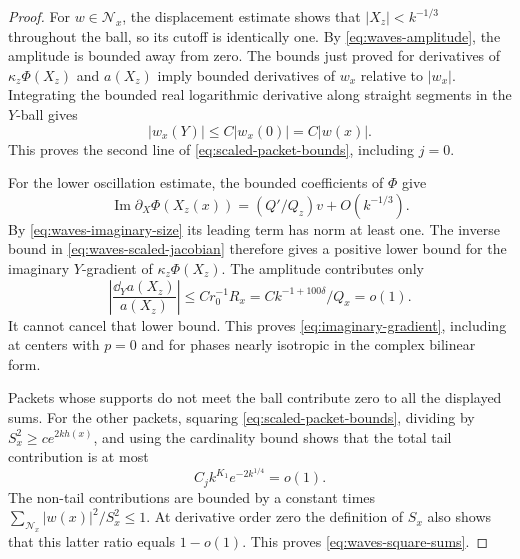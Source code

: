 \begin{proof}
For \(w\in\mathcal N_x\), the displacement estimate shows that
\(|X_z|<k^{-1/3}\) throughout the ball, so its cutoff is identically
one. By \eqref{eq:waves-amplitude}, the amplitude is bounded away
from zero. The bounds just proved for derivatives of
\(\kappa_z\Phi(X_z)\) and \(a(X_z)\) imply bounded derivatives of
\(w_x\) relative to \(|w_x|\).
Integrating the bounded real logarithmic derivative along straight
segments in the \(Y\)-ball gives
\[
 |w_x(Y)|\le C|w_x(0)|=C|w(x)|.
\]
This proves the second line of \eqref{eq:scaled-packet-bounds},
including \(j=0\).

For the lower oscillation estimate, the bounded coefficients of
\(\Phi\) give
\[
 \operatorname{Im}\partial_X\Phi(X_z(x))
   =(Q'/Q_z)v+O(k^{-1/3}).
\]
By \eqref{eq:waves-imaginary-size} its leading term has norm at
least one. The inverse bound in \eqref{eq:waves-scaled-jacobian}
therefore gives a positive lower bound for the imaginary
\(Y\)-gradient of \(\kappa_z\Phi(X_z)\).
The amplitude contributes only
\[
 \left|\frac{\dd_Ya(X_z)}{a(X_z)}\right|
 \le C r_0^{-1}R_x=Ck^{-1+100\delta}/Q_x=o(1).
\]
It cannot cancel that lower bound.
This proves \eqref{eq:imaginary-gradient}, including at centers
with \(p=0\) and for phases nearly isotropic in the complex
bilinear form.

Packets whose supports do not meet the ball contribute zero to
all the displayed sums. For the other packets, squaring
\eqref{eq:scaled-packet-bounds}, dividing by
\(S_x^2\ge c e^{2kh(x)}\), and using the cardinality bound shows
that the total tail contribution is at most
\[
 C_j k^{K_1}e^{-2k^{1/4}}=o(1).
\]
The non-tail contributions are bounded by a constant times
\(\sum_{\mathcal N_x}|w(x)|^2/S_x^2\le1\).
At derivative order zero the definition of \(S_x\) also shows that
this latter ratio equals \(1-o(1)\).
This proves \eqref{eq:waves-square-sums}.
\end{proof}
